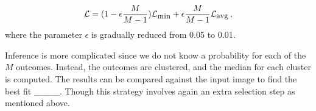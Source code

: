 \begin{equation}\label{eq:M-loss}
\mathcal{L} = (1-\epsilon \frac{M}{M-1}) \mathcal{L}_{\mbox{\small min}} + \epsilon \frac{M}{M-1}  \mathcal{L}_{\mbox{\small avg}}\,,
\end{equation}
%
where the parameter $\epsilon$ is gradually reduced from 0.05 to 0.01.

Inference is more complicated since we do not know a probability for each of the $M$ outcomes. Instead, the outcomes are clustered, and the median for each cluster is computed. The results can be compared against the input image to find the best fit  ____. Though this strategy involves again an extra selection step as mentioned above.